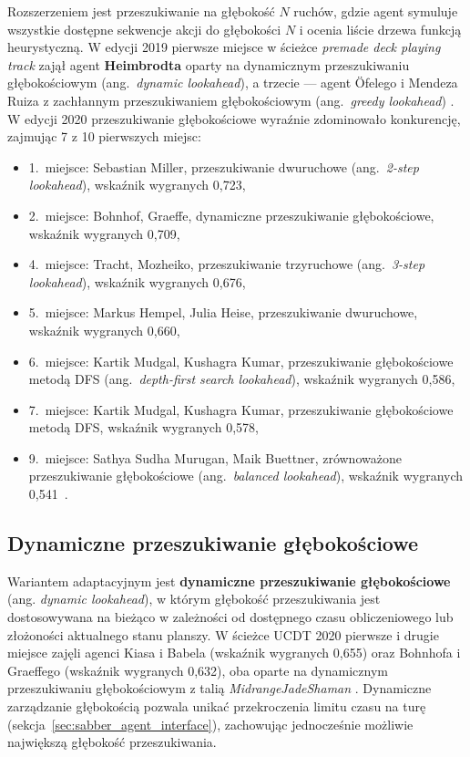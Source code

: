 Rozszerzeniem jest przeszukiwanie na głębokość $N$ ruchów, gdzie agent symuluje wszystkie dostępne sekwencje akcji do głębokości $N$ i ocenia liście drzewa funkcją heurystyczną. W edycji 2019 pierwsze miejsce w ścieżce \textit{premade deck playing track} zajął agent \textbf{Heimbrodta} oparty na dynamicznym przeszukiwaniu głębokościowym (ang.~\textit{dynamic lookahead}), a trzecie --- agent Öfelego i Mendeza Ruiza z zachłannym przeszukiwaniem głębokościowym (ang.~\textit{greedy lookahead}) \cite{hearthstone_competition}. W edycji 2020 przeszukiwanie głębokościowe wyraźnie zdominowało konkurencję, zajmując 7 z 10 pierwszych miejsc:
\begin{itemize}
\item 1.\ miejsce: Sebastian Miller, przeszukiwanie dwuruchowe (ang.~\textit{2-step lookahead}), wskaźnik wygranych 0{,}723,
\item 2.\ miejsce: Bohnhof, Graeffe, dynamiczne przeszukiwanie głębokościowe, wskaźnik wygranych 0{,}709,
\item 4.\ miejsce: Tracht, Mozheiko, przeszukiwanie trzyruchowe (ang.~\textit{3-step lookahead}), wskaźnik wygranych 0{,}676,
\item 5.\ miejsce: Markus Hempel, Julia Heise, przeszukiwanie dwuruchowe, wskaźnik wygranych 0{,}660,
\item 6.\ miejsce: Kartik Mudgal, Kushagra Kumar, przeszukiwanie głębokościowe metodą DFS (ang.~\textit{depth-first search lookahead}), wskaźnik wygranych 0{,}586,
\item 7.\ miejsce: Kartik Mudgal, Kushagra Kumar, przeszukiwanie głębokościowe metodą DFS, wskaźnik wygranych 0{,}578,
\item 9.\ miejsce: Sathya Sudha Murugan, Maik Buettner, zrównoważone przeszukiwanie głębokościowe (ang.~\textit{balanced lookahead}), wskaźnik wygranych 0{,}541~\cite{hearthstone_competition}.
\end{itemize}

\subsection{Dynamiczne przeszukiwanie głębokościowe}

Wariantem adaptacyjnym jest \textbf{dynamiczne przeszukiwanie głębokościowe} (ang. \textit{dynamic lookahead}), w którym głębokość przeszukiwania jest dostosowywana na bieżąco w zależności od dostępnego czasu obliczeniowego lub złożoności aktualnego stanu planszy. W ścieżce UCDT 2020 pierwsze i drugie miejsce zajęli agenci Kiasa i Babela (wskaźnik wygranych 0{,}655) oraz Bohnhofa i Graeffego (wskaźnik wygranych 0{,}632), oba oparte na dynamicznym przeszukiwaniu głębokościowym z talią \textit{MidrangeJadeShaman} \cite{hearthstone_competition}. Dynamiczne zarządzanie głębokością pozwala unikać przekroczenia limitu czasu na turę (sekcja~\ref{sec:sabber_agent_interface}), zachowując jednocześnie możliwie największą głębokość przeszukiwania.

